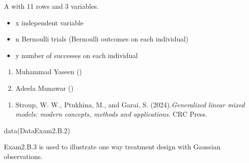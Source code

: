 \documentclass[a4paper]{book}
\begin{document}
%
\begin{Format}
A  with 11 rows and 3 variables.
\end{Format}
%
\begin{Details}
\begin{itemize}

\item{} x independent variable
\item{} n Bernoulli trials (Bernoulli outcomes on each individual)
\item{} y number of successes on each individual

\end{itemize}

\end{Details}
%
\begin{Author}
\begin{enumerate}

\item{}  Muhammad Yaseen ()
\item{} Adeela Munawar ()

\end{enumerate}

\end{Author}
%
\begin{References}
\begin{enumerate}

\item{} Stroup, W. W., Ptukhina, M., and Garai, S. (2024).\emph{Generalized linear mixed models: modern concepts, methods and applications}.
CRC Press.

\end{enumerate}

\end{References}
%
\begin{SeeAlso}
\end{SeeAlso}
%
\begin{Examples}
\begin{ExampleCode}
data(DataExam2.B.2)
\end{ExampleCode}
\end{Examples}
%
\begin{Description}
Exam2.B.3 is used to illustrate one way treatment design with Gaussian observations.
\end{Description}
\end{document}

